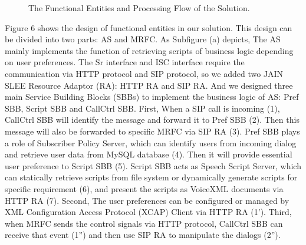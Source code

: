 \documentclass[10pt, conference, a4paper]{IEEEtran}
\begin{document}
\begin{figure}[!t]
\centering
{}
\caption{The Functional Entities and Processing Flow of the Solution.}
\end{figure}

Figure 6 shows the design of functional entities in our solution. This design can be divided into two parts: AS and MRFC. As Subfigure (a) depicts, The AS mainly implements the function of retrieving scripts of business logic depending on user preferences. The Sr interface and ISC interface require the communication via HTTP protocol and SIP protocol, so we added two JAIN SLEE Resource Adaptor (RA): HTTP RA and SIP RA. And we designed three main Service Building Blocks (SBBs) to implement the business logic of AS: Pref SBB, Script SBB and CallCtrl SBB. First, When a SIP call is incoming (1), CallCtrl SBB will identify the message and forward it to Pref SBB (2). Then this message will also be forwarded to specific MRFC via SIP RA (3). Pref SBB plays a role of Subscriber Policy Server, which can identify users from incoming dialog and retrieve user data from MySQL database (4). Then it will provide essential user preference to Script SBB (5). Script SBB acts as Speech Script Server, which can statically retrieve scripts from file system or dynamically generate scripts for specific requirement (6), and present the scripts as VoiceXML documents via HTTP RA (7). Second, The user preferences can be configured or managed by XML Configuration Access Protocol (XCAP) Client via HTTP RA (1'). Third, when MRFC sends the control signals via HTTP protocol, CallCtrl SBB can receive that event (1'') and then use SIP RA to manipulate the dialogs (2'').
\end{document}
